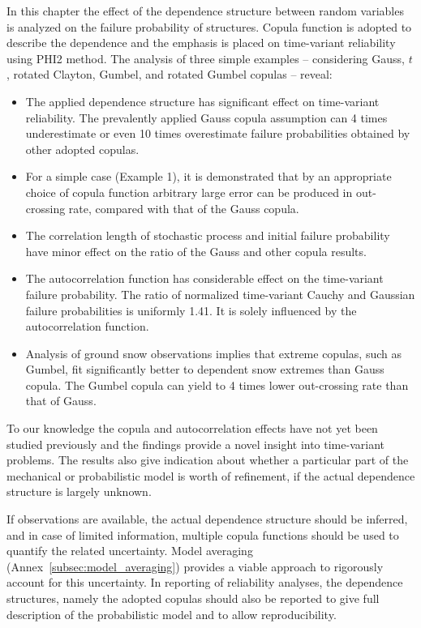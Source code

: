 In this chapter the effect of the dependence structure between random variables is analyzed on the failure probability of structures. Copula function is adopted to describe the dependence and the emphasis is placed on time-variant reliability using PHI2 method. The analysis of three simple examples -- considering Gauss, $t$, rotated Clayton, Gumbel, and rotated Gumbel copulas -- reveal:
\begin{itemize}
	\item The applied dependence structure has significant effect on time-variant reliability. The prevalently applied Gauss copula assumption can 4 times underestimate or even 10 times overestimate failure probabilities obtained by other adopted copulas.
	\item For a simple case (Example 1), it is demonstrated that by an appropriate choice of copula function arbitrary large error can be produced in out-crossing rate, compared with that of the Gauss copula.
	\item The correlation length of stochastic process and initial failure probability have minor effect on the ratio of the Gauss and other copula results.
	\item The autocorrelation function has considerable effect on the time-variant failure probability. The ratio of normalized time-variant Cauchy and Gaussian failure probabilities is uniformly 1.41. It is solely influenced by the autocorrelation function.
	\item Analysis of ground snow observations implies that extreme copulas, such as Gumbel, fit significantly better to dependent snow extremes than Gauss copula. The Gumbel copula can yield to 4 times lower out-crossing rate than that of Gauss.
\end{itemize}
	
To our knowledge the copula and autocorrelation effects have not yet been studied previously and the findings provide a novel insight into time-variant problems.
The results also give indication about whether a particular part of the mechanical or probabilistic model is worth of refinement, if the actual dependence structure is largely unknown.

If observations are available, the actual dependence structure should be inferred, and in case of limited information, multiple copula functions should be used to quantify the related uncertainty. Model averaging (Annex~\ref{subsec:model_averaging}) provides a viable approach to rigorously account for this uncertainty. In reporting of reliability analyses, the dependence structures, namely the adopted copulas should also be reported to give full description of the probabilistic model and to allow reproducibility.